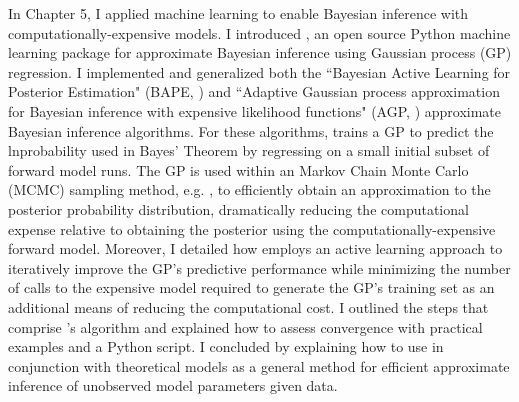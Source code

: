 In Chapter 5, I applied machine learning to enable Bayesian inference with computationally-expensive models. I introduced \approxposterior, an open source Python machine learning package for approximate Bayesian inference using Gaussian process (GP) regression. I implemented and generalized both the ``Bayesian Active Learning for Posterior Estimation" (BAPE, \citet{Kandasamy2017}) and ``Adaptive Gaussian process approximation for Bayesian inference with expensive likelihood functions" (AGP, \citet{Wang2018}) approximate Bayesian inference algorithms. For these algorithms, \approxposterior trains a GP to predict the lnprobability used in Bayes' Theorem by regressing on a small initial subset of forward model runs. The GP is used within an Markov Chain Monte Carlo (MCMC) sampling method, e.g. \emcee, to efficiently obtain an approximation to the posterior probability distribution, dramatically reducing the computational expense relative to obtaining the posterior using the computationally-expensive forward model. Moreover, I detailed how \approxposterior employs an active learning approach to iteratively improve the GP's predictive performance while minimizing the number of calls to the expensive model required to generate the GP's training set as an additional means of reducing the computational cost.  I outlined the steps that comprise \approxposterior's algorithm and explained how to assess convergence with practical examples and a Python script. I concluded by explaining how to use \approxposterior in conjunction with theoretical models as a general method for efficient approximate inference of unobserved model parameters given data.
 
